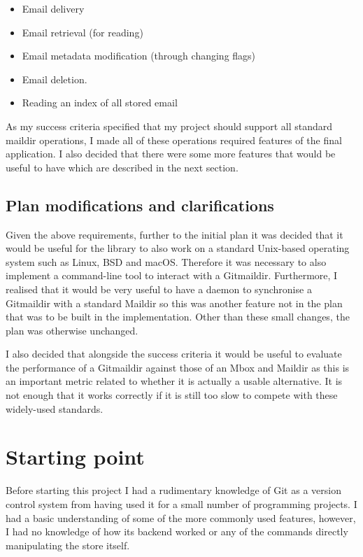 \begin{itemize}
  \item Email delivery
  \item Email retrieval (for reading)
  \item Email metadata modification (through changing flags)
  \item Email deletion.
  \item Reading an index of all stored email
\end{itemize}

As my success criteria specified that my project should support all standard maildir operations, I made all of these operations required features of the final application. I also decided that there were some more features that would be useful to have which are described in the next section.

\subsection{Plan modifications and clarifications}

Given the above requirements, further to the initial plan it was decided that it would be useful for the library to also work on a standard Unix-based operating system such as Linux, BSD and macOS. Therefore it was necessary to also implement a command-line tool to interact with a Gitmaildir. Furthermore, I realised that it would be very useful to have a daemon to synchronise a Gitmaildir with a standard Maildir so this was another feature not in the plan that was to be built in the implementation. Other than these small changes, the plan was otherwise unchanged.

I also decided that alongside the success criteria it would be useful to evaluate the performance of a Gitmaildir against those of an Mbox and Maildir as this is an important metric related to whether it is actually a usable alternative. It is not enough that it works correctly if it is still too slow to compete with these widely-used standards.

\section{Starting point}

Before starting this project I had a rudimentary knowledge of Git as a version control system from having used it for a small number of programming projects. I had a basic understanding of some of the more commonly used features, however, I had no knowledge of how its backend worked or any of the commands directly manipulating the store itself.

